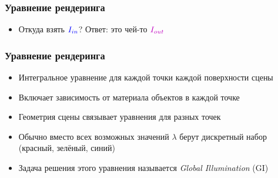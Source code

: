 \documentclass[10pt]{beamer}
\begin{document}
\begin{frame}[fragile]
\frametitle{Уравнение рендеринга}
\begin{itemize}
\item Откуда взять \begin{math}{\color{blue}I_{in}}\end{math}? \pause Ответ: это чей-то \begin{math}{\color{magenta}I_{out}}\end{math} 
\end{itemize}
\begin{center}
\end{center}
\end{frame}

\begin{frame}[fragile]
\frametitle{Уравнение рендеринга}
\begin{itemize}
\item Интегральное уравнение для каждой точки каждой поверхности сцены
\pause
\item Включает зависимость от материала объектов в каждой точке
\pause
\item Геометрия сцены связывает уравнения для разных точек
\pause
\item Обычно вместо всех возможных значений \begin{math}\lambda\end{math} берут дискретный набор ({\color{red}красный}, {\color{green}зелёный}, {\color{blue}синий})
\pause
\item Задача решения этого уравнения называется \textit{Global Illumination} (GI)
\end{itemize}
\end{frame}
\end{document}
